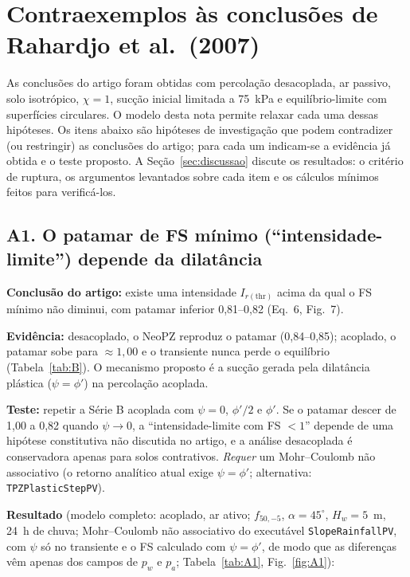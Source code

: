\section{Contraexemplos \`as conclus\~oes de Rahardjo et al.\ (2007)}\label{sec:contraexemplos}

As conclus\~oes do artigo foram obtidas com percola\c{c}\~ao desacoplada, ar passivo, solo isotr\'opico, $\chi=1$,
suc\c{c}\~ao inicial limitada a 75~kPa e equil\'ibrio-limite com superf\'icies circulares. O modelo desta nota permite
relaxar cada uma dessas hip\'oteses. Os itens abaixo s\~ao hip\'oteses de investiga\c{c}\~ao que podem contradizer
(ou restringir) as conclus\~oes do artigo; para cada um indicam-se a evid\^encia j\'a obtida e o teste proposto. A
Se\c{c}\~ao~\ref{sec:discussao} discute os resultados: o crit\'erio de ruptura, os argumentos levantados sobre cada item
e os c\'alculos m\'inimos feitos para verific\'a-los.

\subsection{A1. O patamar de FS m\'inimo (``intensidade-limite'') depende da dilat\^ancia}

\textbf{Conclus\~ao do artigo:} existe uma intensidade $I_{r(\mathrm{thr})}$ acima da qual o FS m\'inimo n\~ao diminui,
com patamar inferior 0,81--0,82 (Eq.~6, Fig.~7).

\textbf{Evid\^encia:} desacoplado, o NeoPZ reproduz o patamar (0,84--0,85); acoplado, o patamar sobe para
$\approx1{,}00$ e o transiente nunca perde o equil\'ibrio (Tabela~\ref{tab:B}). O mecanismo proposto \'e a suc\c{c}\~ao
gerada pela dilat\^ancia pl\'astica ($\psi=\phi'$) na percola\c{c}\~ao acoplada.

\textbf{Teste:} repetir a S\'erie B acoplada com $\psi=0$, $\phi'/2$ e $\phi'$. Se o patamar descer de 1,00 a 0,82
quando $\psi\to0$, a ``intensidade-limite com FS $<1$'' depende de uma hip\'otese constitutiva n\~ao discutida no
artigo, e a an\'alise desacoplada \'e conservadora apenas para solos contrativos. \emph{Requer} um Mohr--Coulomb
n\~ao associativo (o retorno anal\'itico atual exige $\psi=\phi'$; alternativa: \texttt{TPZPlasticStepPV}).

\textbf{Resultado} (modelo completo: acoplado, ar ativo; $f_{50,-5}$, $\alpha=45^\circ$, $H_w=5$~m, 24~h de chuva;
Mohr--Coulomb n\~ao associativo do execut\'avel \texttt{SlopeRainfallPV}, com $\psi$ s\'o no transiente e o FS
calculado com $\psi=\phi'$, de modo que as diferen\c{c}as v\^em apenas dos campos de $p_w$ e $p_a$;
Tabela~\ref{tab:A1}, Fig.~\ref{fig:A1}):

